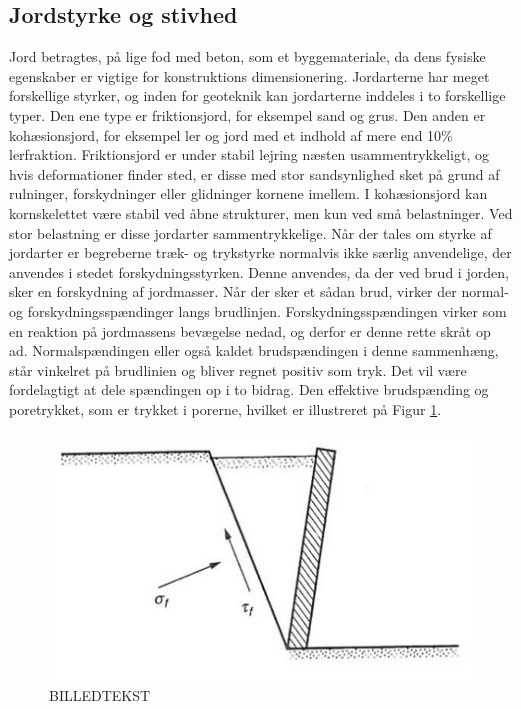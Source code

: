 \subsection{Jordstyrke og stivhed}
Jord betragtes, på lige fod med beton, som et byggemateriale, da dens fysiske egenskaber er vigtige for konstruktions dimensionering. 
\newline \indent{     }  Jordarterne har meget forskellige styrker, og inden for geoteknik kan jordarterne inddeles i to forskellige typer. Den ene type er friktionsjord, for eksempel sand og grus. Den anden er kohæsionsjord, for eksempel ler og jord med et indhold af mere end 10\% lerfraktion. 
Friktionsjord er under stabil lejring næsten usammentrykkeligt, og hvis deformationer finder sted, er disse med stor sandsynlighed sket på grund af rulninger, forskydninger eller glidninger kornene imellem.
\newline \indent{     }  I kohæsionsjord kan kornskelettet være stabil ved åbne strukturer, men kun ved små belastninger. Ved stor belastning er disse jordarter sammentrykkelige.
\newline \indent{     }  Når der tales om styrke af jordarter er begreberne træk- og trykstyrke normalvis ikke særlig anvendelige, der anvendes i stedet forskydningsstyrken. Denne anvendes, da der ved brud i jorden, sker en forskydning af jordmasser. Når der sker et sådan brud, virker der normal- og forskydningsspændinger langs brudlinjen. Forskydningsspændingen virker som en reaktion på jordmassens bevægelse nedad, og derfor er denne rette skråt op ad. Normalspændingen eller også kaldet brudspændingen i denne sammenhæng, står vinkelret på brudlinien og bliver regnet positiv som tryk. Det vil være fordelagtigt at dele spændingen op i to bidrag. Den effektive brudspænding og poretrykket, som er trykket i porerne, hvilket er illustreret på Figur \ref{fig:poretrykket}. 

\begin{figure}[htbp] \centering
	\begin{minipage}[b]{0.48\textwidth}\centering
		\includegraphics[width=1.0\textwidth]{billeder/poretrykket.png}
		\caption{BILLEDTEKST}
		\label{fig:poretrykket}
	\end{minipage}\hfill
\end{figure}

